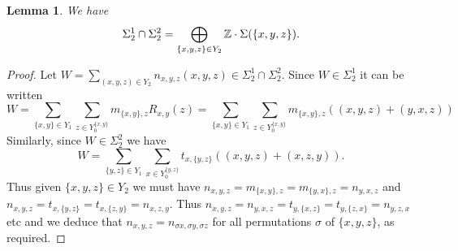 \documentclass[12pt]{amsart}
\newtheorem{lem}{Lemma}[section]
\theoremstyle{definition}
\newcommand{\Z}{\Bbb{Z}}
\newcommand{\<}{\langle}
\renewcommand{\>}{\rangle}
\begin{document}
\begin{lem}\label{lem:K} We have 
\[
\Sigma_2^1\cap\Sigma_2^2 =\bigoplus_{\{ x,y,z\}\in Y_2}\Z\cdot \Sigma(\{ x,y,z\}).
\]
\end{lem} 

\begin{proof}  Let $W=\sum_{(x,y,z)\in Y_2}n_{x,y,z}(x,y,z)\in \Sigma_2^1\cap\Sigma_2^2 $.  Since $W\in \Sigma_2^1$ it can be written 
\[
W=\sum_{\{ x,y\}\in Y_1}\sum_{z\in {Y^{\{ x,y\}}_0} }m_{\{x,y\},z}R_{x,y}(z)=\sum_{\{ x,y\}\in Y_1}\sum_{z\in Y^{\{ x,y\}}_0}m_{\{x,y\},z}\left( (x,y,z)+(y,x,z)\right)
\]
Similarly, since $W\in \Sigma_2^2$ we have
\[
W=\sum_{\{ y,z\}\in Y_1}\sum_{x\in Y^{\{ y,z\}}_0}t_{x,\{ y,z\}}\left( (x,y,z)+(x,z,y)\right).
\]
Thus given $\{x,y,z\}\in Y_2$ we must have $n_{x,y,z}=m_{\{ x,y\},z}=m_{\{ y,x\},z}=n_{y,x,z}$ and $n_{x,y,z}=t_{x,\{y,z\}}=t_{x,\{z,y\}}=n_{x,z,y}$. Thus 
$n_{x,y,z}=n_{y,x,z}=t_{y, \{ x,z\}}=t_{y, \{ z,x\}}=n_{y,z,x}$ etc and we deduce that $n_{x,y,z}=n_{\sigma x,\sigma y,\sigma z}$ for all permutations $\sigma$ of $\{ x,y,z\}$, as required.
\end{proof}

\end{document}
